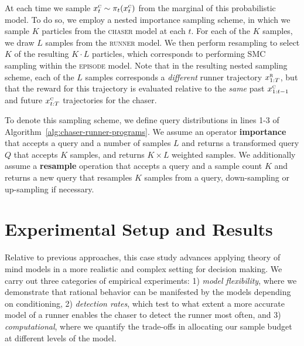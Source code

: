 \documentclass[twoside]{article}
\begin{document}
At each time we sample $x^\textsc{c}_t \sim \pi_t(x^\textsc{c}_t)$ from the marginal of this probabilistic model. To do so, we employ a nested importance sampling scheme, in which we sample $K$ particles from the \textsc{chaser} model at each $t$. For each of the $K$ samples, we draw $L$ samples from the \textsc{runner} model. We then perform resampling to select $K$ of the resulting $K \cdot L$ particles, which corresponds to performing SMC sampling within the \textsc{episode} model. Note that in the resulting nested sampling scheme, each of the $L$ samples corresponds a \emph{different} runner trajectory $x^\textsc{r}_{1:T}$, but that the reward for this trajectory is evaluated relative to the \emph{same} past $x^\textsc{c}_{1:t-1}$ and future $x^\textsc{c}_{t:T}$ trajectories for the chaser. 

To denote this sampling scheme, we define query distributions in lines 1-3 of Algorithm~\ref{alg:chaser-runner-programs}. We assume an operator \textbf{importance} that accepts a query and a number of samples $L$ and returns a transformed query $Q$ that accepts $K$ samples, and returns $K \times L$ weighted samples. We additionally assume a \textbf{resample} operation that accepts a query and a sample count $K$ and returns a new query that resamples $K$ samples from a query, down-sampling or up-sampling if necessary. 

\section{Experimental Setup and Results}

Relative to previous approaches, this case study advances applying theory of mind models in a more realistic and complex setting for decision making. %
We carry out three categories of empirical experiments: 1) \textit{model flexibility}, where we demonstrate that rational behavior can be manifested by the models depending on conditioning, 2) \textit{detection rates}, which test to what extent a more accurate model of a runner enables the chaser to detect the runner most often, and 3) \textit{computational}, where we quantify the trade-offs in allocating our sample budget at different levels of the model. 

\end{document}
